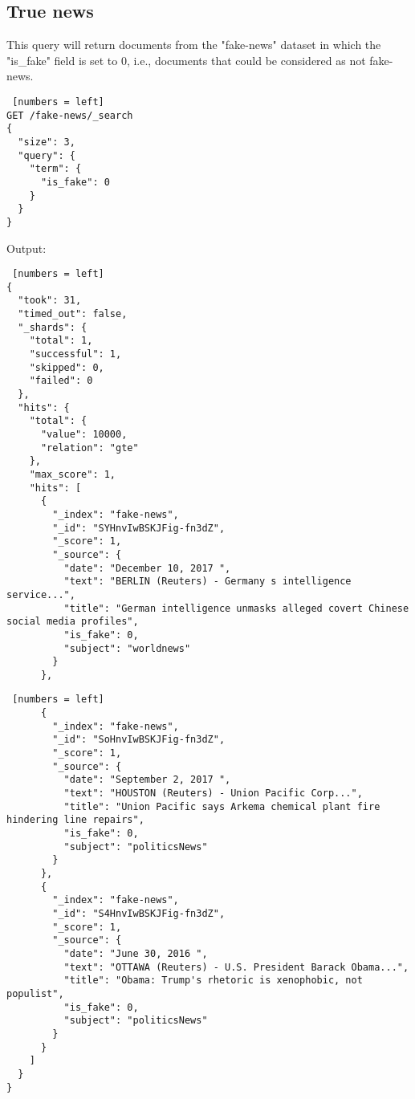 \newpage

\subsection{True news}
This query will return documents from the "fake-news" dataset in which the "is\_fake" field is set to 0, i.e., documents that could be considered as not fake-news.\\

\begin{algorithm}[ht]
\caption{True news}
\begin{lstlisting} [numbers = left]
GET /fake-news/_search
{  
  "size": 3,
  "query": {
    "term": {
      "is_fake": 0
    }
  }
}
\end{lstlisting}
\end{algorithm}
\newpage

Output:
\begin{algorithm}[h!]
\caption{True news}
\begin{lstlisting} [numbers = left]
{
  "took": 31,
  "timed_out": false,
  "_shards": {
    "total": 1,
    "successful": 1,
    "skipped": 0,
    "failed": 0
  },
  "hits": {
    "total": {
      "value": 10000,
      "relation": "gte"
    },
    "max_score": 1,
    "hits": [
      {
        "_index": "fake-news",
        "_id": "SYHnvIwBSKJFig-fn3dZ",
        "_score": 1,
        "_source": {
          "date": "December 10, 2017 ",
          "text": "BERLIN (Reuters) - Germany s intelligence service...",
          "title": "German intelligence unmasks alleged covert Chinese social media profiles",
          "is_fake": 0,
          "subject": "worldnews"
        }
      },
\end{lstlisting}
\end{algorithm}
\newpage
\begin{algorithm}[h!]
\caption{True news}
\begin{lstlisting} [numbers = left]
      {
        "_index": "fake-news",
        "_id": "SoHnvIwBSKJFig-fn3dZ",
        "_score": 1,
        "_source": {
          "date": "September 2, 2017 ",
          "text": "HOUSTON (Reuters) - Union Pacific Corp...",
          "title": "Union Pacific says Arkema chemical plant fire hindering line repairs",
          "is_fake": 0,
          "subject": "politicsNews"
        }
      },
      {
        "_index": "fake-news",
        "_id": "S4HnvIwBSKJFig-fn3dZ",
        "_score": 1,
        "_source": {
          "date": "June 30, 2016 ",
          "text": "OTTAWA (Reuters) - U.S. President Barack Obama...",
          "title": "Obama: Trump's rhetoric is xenophobic, not populist",
          "is_fake": 0,
          "subject": "politicsNews"
        }
      }
    ]
  }
}

\end{lstlisting}
\end{algorithm}
\newpage
